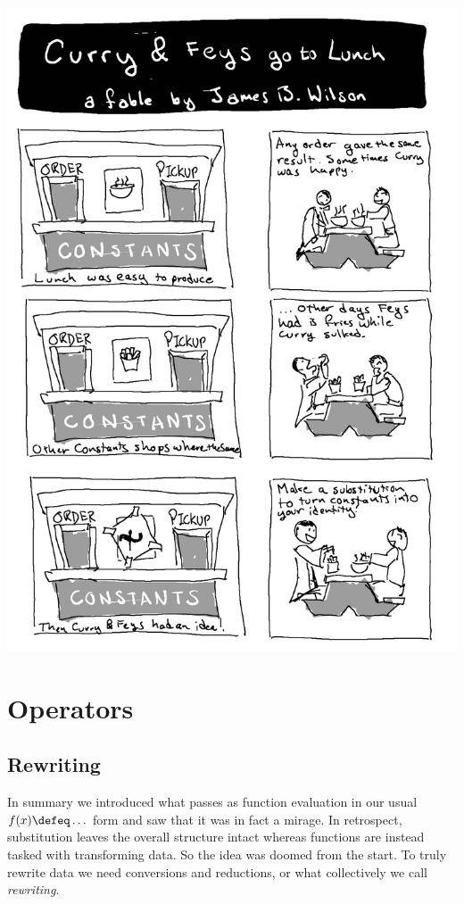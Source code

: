 
\cleardoublepage

\includegraphics[width=\textwidth]{curry-feys.png}

\chapter{Operators }





% 

\section{Rewriting}
In summary we introduced what passes as function evaluation 
in our usual $f(x)\defeq \ldots$ form and saw that it was in fact 
a mirage.  In retrospect, substitution leaves the overall structure 
intact whereas functions are instead tasked with transforming data.
So the idea was doomed from the start.  To truly rewrite data we need 
conversions and reductions, or what collectively we call \emph{rewriting}.

